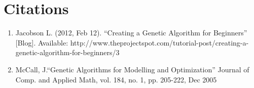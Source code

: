 \section{Citations}

\begin{enumerate}
	\item Jacobson L. (2012, Feb 12). “Creating a Genetic Algorithm for Beginners” [Blog]. Available: http://www.theprojectspot.com/tutorial-post/creating-a-genetic-algorithm-for-beginners/3 
	\item McCall, J.“Genetic Algorithms for Modelling and Optimization” Journal of Comp. and Applied Math, vol. 184, no. 1, pp. 205-222, Dec 2005
\end{enumerate}